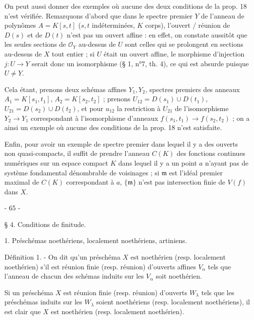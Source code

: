 On peut aussi donner des exemples où aucune des deux conditions de la prop. 18 n'est vérifiée. Remarquons d'abord que dans le spectre premier $Y$ de l'anneau de polynômes $A=K[s, t]$ ($s, t$ indéterminées, $K$ corps), l'ouvert / réunion de $D(s)$ et de $D(t)$ n'est pas un ouvert affine : en effet, on constate aussitôt que les seules sections de $\mathcal{O}_Y$ au-dessus de $U$ sont celles qui se prolongent en sections au-dessus de $X$ tout entier ; si $U$ était un ouvert affine, le morphisme d'injection $j: U \to Y$ serait donc un isomorphisme (§ 1, n°7, th. 4), ce qui est absurde puisque $U \neq Y$.

Cela étant, prenons deux schémas affines $Y_1, Y_2$, spectres premiers des anneaux $A_1 = K[s_1, t_1]$, $A_2 = K[s_2, t_2]$ ; prenons $U_{12} = D(s_1) \cup D(t_1)$, $U_{21} = D(s_2) \cup D(t_2)$, et pour $u_{12}$ la restriction à $U_{21}$ de l'isomorphisme $Y_2 \to Y_1$ correspondant à l'isomorphisme d'anneaux $f(s_1, t_1) \to f(s_2, t_2)$ ; on a ainsi un exemple où aucune des conditions de la prop. 18 n'est satisfaite.

Enfin, pour avoir un exemple de spectre premier dans lequel il y a des ouverts non quasi-compacts, il suffit de prendre l'anneau $C(K)$ des fonctions continues numériques sur un espace compact $K$ dans lequel il y a un point $a$ n'ayant pas de système fondamental dénombrable de voisinages ; si $\mathfrak{m}$ est l'idéal premier maximal de $C(K)$ correspondant à $a$, $\{\mathfrak{m}\}$ n'est pas intersection finie de $V(f)$ dans $X$.

\newpage



- 65 -

§ 4. Conditions de finitude.

1. Préschémas noethériens, localement noethériens, artiniens.

Définition 1. - On dit qu'un préschéma $X$ est noethérien (resp. localement noethérien) s'il est réunion finie (resp. réunion) d'ouverts affines $V_\alpha$ tels que l'anneau de chacun des schémas induits sur les $V_\alpha$ soit noethérien.

Si un préschéma $X$ est réunion finie (resp. réunion) d'ouverts $W_\lambda$ tels que les préschémas induits sur les $W_\lambda$ soient noethériens (resp. localement noethériens), il est clair que $X$ est noethérien (resp. localement noethérien).

